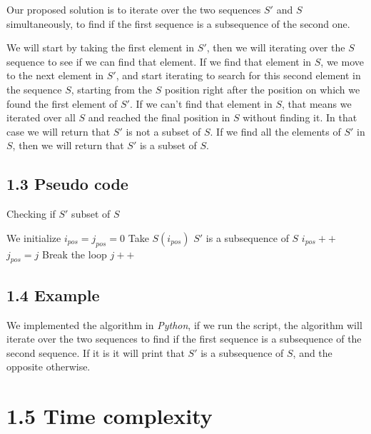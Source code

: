 \documentclass{article}
\begin{document}
Our proposed solution is to iterate over the two sequences $S'$ and $S$ simultaneously, to find if the first sequence is a subsequence of the second one.

We will start by taking the first element in $S'$, then we will iterating over the $S$ sequence to see if we can find that element. If we find that element in $S$, we move to the next element in $S'$, and start iterating to search for this second element in the sequence $S$, starting from the $S$ position right after the position on which we found the first element of $S'$. If we can't find that element in $S$, that means we iterated over all $S$ and reached the final position in $S$ without finding it. In that case we will return that $S'$ is not a subset of $S$. If we find all the elements of $S'$ in $S$, then we will return that $S'$ is a subset of $S$.

\subsection*{1.3 Pseudo code}

\begin{algorithm}[H]
\caption{Checking if $S'$ subset of $S$}
\begin{algorithmic}[1]
\State We initialize $i_{pos} = j_{pos} = 0$
 \State Take $S(i_{pos})$
    \State $S'$ is a subsequence of $S$
   \EndIf
    \State $i_{pos}++$
    \State $j_{pos} = j$
    \State Break the loop
   \EndIf
  \EndIf
   \State $j++$
  \EndIf
 \EndFor
\EndWhile
\end{algorithmic}
\end{algorithm}

\subsection*{1.4 Example}

We implemented the algorithm in \textit{Python}, if we run the script, the algorithm will iterate over the two sequences to find if the first sequence is a subsequence of the second sequence. If it is it will print that $S'$ is a subsequence of $S$, and the opposite otherwise.



\section*{1.5 Time complexity}
\end{document}
